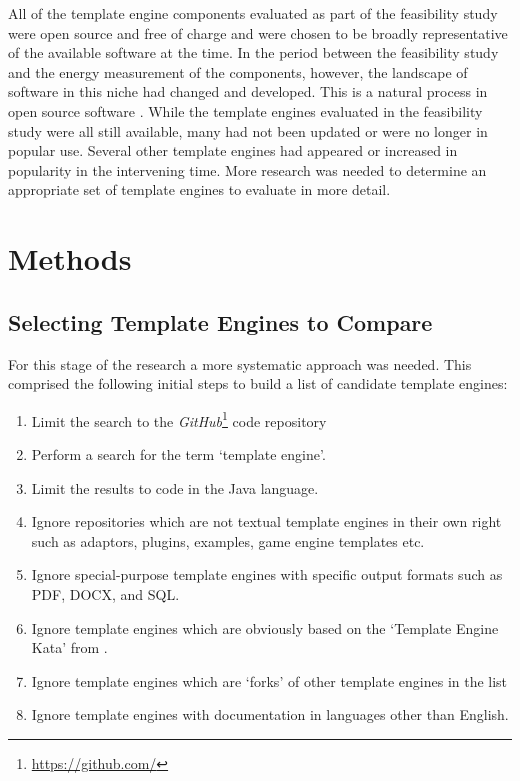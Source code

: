 All of the template engine components evaluated as part of the feasibility study were open source and free of charge and were chosen to be broadly representative of the available software at the time. In the period between the feasibility study and the energy measurement of the components, however, the landscape of software in this niche had changed and developed. This is a natural process in open source software \citep{Sonatype2023} \citep{Xie2009}. While the template engines evaluated in the feasibility study were all still available, many had not been updated or were no longer in popular use. Several other template engines had appeared or increased in popularity in the intervening time. More research was needed to determine an appropriate set of template engines to evaluate in more detail.

\section{Methods}

\subsection{Selecting Template Engines to Compare}
\label{section:comp:selecting}

For this stage of the research a more systematic approach was needed. This comprised the following initial steps to build a list of candidate template engines:

\begin{enumerate}
    \parsep
    \item Limit the search to the \emph{GitHub}\footnote{\url{https://github.com/}} code repository
    \item Perform a search for the term `template engine'.
    \item Limit the results to code in the Java language.
    \item Ignore repositories which are not textual template engines in their own right such as adaptors, plugins, examples, game engine templates etc.
    \item Ignore special-purpose template engines with specific output formats such as PDF, DOCX, and SQL.
    \item Ignore template engines which are obviously based on the `Template Engine Kata' from \citet{Koskela2007}.
    \item Ignore template engines which are `forks' of other template engines in the list
    \item Ignore template engines with documentation in languages other than English.
\end{enumerate}

